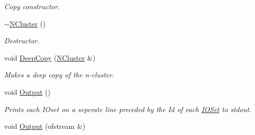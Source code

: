 \begin{DoxyCompactItemize}
\begin{DoxyCompactList}\small\item\em Copy constructor. \item\end{DoxyCompactList}\item 
\hypertarget{class_n_cluster_aae72a31bc6c2f05934a6d2248d966be5}{
\hyperlink{class_n_cluster_aae72a31bc6c2f05934a6d2248d966be5}{$\sim$NCluster} ()}
\label{class_n_cluster_aae72a31bc6c2f05934a6d2248d966be5}

\begin{DoxyCompactList}\small\item\em Destructor. \item\end{DoxyCompactList}\item 
\hypertarget{class_n_cluster_a84dd370bb3e73f192187156cd7dba57b}{
void \hyperlink{class_n_cluster_a84dd370bb3e73f192187156cd7dba57b}{DeepCopy} (\hyperlink{class_n_cluster}{NCluster} \&)}
\label{class_n_cluster_a84dd370bb3e73f192187156cd7dba57b}

\begin{DoxyCompactList}\small\item\em Makes a deep copy of the n-\/cluster. \item\end{DoxyCompactList}\item 
\hypertarget{class_n_cluster_a695c426f13c2fb78015c2f6d8714dc38}{
void \hyperlink{class_n_cluster_a695c426f13c2fb78015c2f6d8714dc38}{Output} ()}
\label{class_n_cluster_a695c426f13c2fb78015c2f6d8714dc38}

\begin{DoxyCompactList}\small\item\em Prints each IOset on a seperate line preceded by the Id of each \hyperlink{class_i_o_set}{IOSet} to stdout. \item\end{DoxyCompactList}\item 
\hypertarget{class_n_cluster_afb92f84876326645c2d3e46c011c6fdf}{
void \hyperlink{class_n_cluster_afb92f84876326645c2d3e46c011c6fdf}{Output} (ofstream \&)}
\label{class_n_cluster_afb92f84876326645c2d3e46c011c6fdf}


\end{DoxyCompactItemize}
